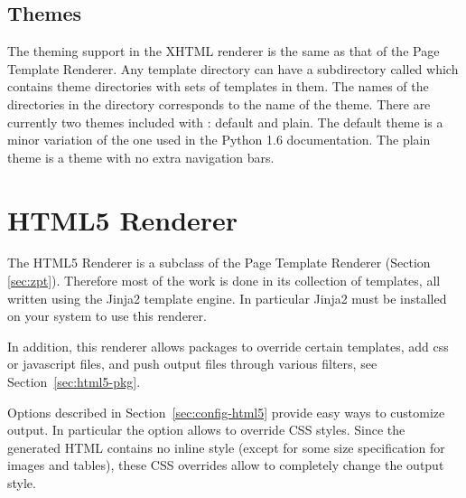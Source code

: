 \subsection{Themes}

The theming support in the XHTML renderer is the same as that of the
Page Template Renderer.  Any template directory can have a subdirectory called
 which contains theme directories with sets of templates
in them.  The names of the directories in the  directory
corresponds to the name of the theme.  There are currently two themes
included with \plasTeX: default and plain.  The default theme is a
minor variation of the one used in the Python 1.6 documentation.  The
plain theme is a theme with no extra navigation bars. 

\section{HTML5 Renderer}\label{sec:html5}

The HTML5 Renderer is a subclass of the Page Template Renderer (Section
\ref{sec:zpt}). Therefore most of the work is done in its collection of
templates, all written using the Jinja2 template engine. In particular
Jinja2 must be installed on your system to use this renderer.

In addition, this renderer allows packages to override certain templates,
add css or javascript files, and push output files through various
filters, see Section~\ref{sec:html5-pkg}.

Options described in Section~\ref{sec:config-html5} provide easy ways to
customize output. In particular the  option
allows to override CSS styles. Since the generated HTML contains no
inline style (except for some size specification for images and tables),
these CSS overrides allow to completely change the output style.

